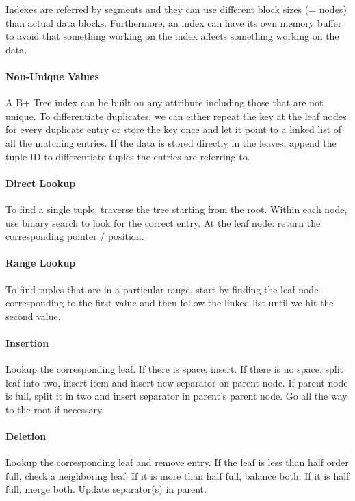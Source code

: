 Indexes are referred by segments and they can use different block sizes (= nodes) than actual data blocks. Furthermore, an index can have its own memory buffer to avoid that something working on the index affects something working on the data.



\paragraph{Non-Unique Values}
A B+ Tree index can be built on any attribute including those that are not unique. To differentiate duplicates, we can either repeat the key at the leaf nodes for every duplicate entry or store the key once and let it point to a linked list of all the matching entries. If the data is stored directly in the leaves, append the tuple ID to differentiate tuples the entries are referring to. %

\paragraph{Direct Lookup}
To find a single tuple, traverse the tree starting from the root. Within each node, use binary search to look for the correct entry. At the leaf node: return the corresponding pointer / position.

\paragraph{Range Lookup}
To find tuples that are in a particular range, start by finding the leaf node corresponding to the first value and then follow the linked list until we hit the second value.

\paragraph{Insertion}
Lookup the corresponding leaf. If there is space, insert. If there is no space, split leaf into two, insert item and insert new separator on parent node. If parent node is full, split it in two and insert separator in parent's parent node. Go all the way to the root if necessary. %

\paragraph{Deletion}
Lookup the corresponding leaf and remove entry. If the leaf is less than half order full, check a neighboring leaf. If it is more than half full, balance both. If it is half full, merge both. Update separator(s) in parent. %

